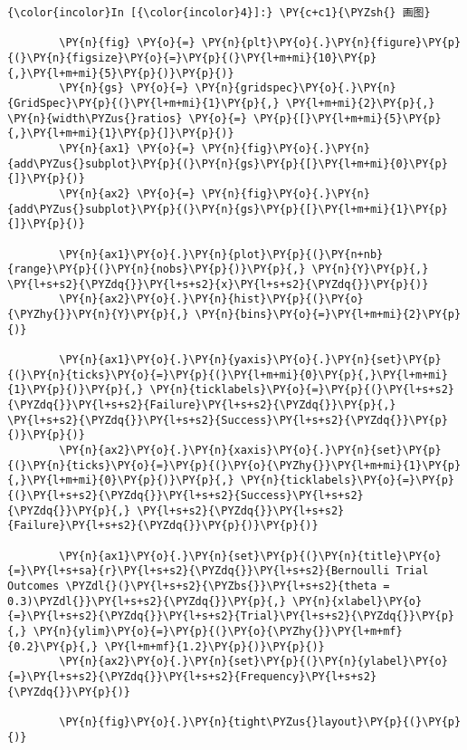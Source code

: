     \begin{Verbatim}[commandchars=\\\{\}]
{\color{incolor}In [{\color{incolor}4}]:} \PY{c+c1}{\PYZsh{} 画图}

        \PY{n}{fig} \PY{o}{=} \PY{n}{plt}\PY{o}{.}\PY{n}{figure}\PY{p}{(}\PY{n}{figsize}\PY{o}{=}\PY{p}{(}\PY{l+m+mi}{10}\PY{p}{,}\PY{l+m+mi}{5}\PY{p}{)}\PY{p}{)}
        \PY{n}{gs} \PY{o}{=} \PY{n}{gridspec}\PY{o}{.}\PY{n}{GridSpec}\PY{p}{(}\PY{l+m+mi}{1}\PY{p}{,} \PY{l+m+mi}{2}\PY{p}{,} \PY{n}{width\PYZus{}ratios} \PY{o}{=} \PY{p}{[}\PY{l+m+mi}{5}\PY{p}{,}\PY{l+m+mi}{1}\PY{p}{]}\PY{p}{)}
        \PY{n}{ax1} \PY{o}{=} \PY{n}{fig}\PY{o}{.}\PY{n}{add\PYZus{}subplot}\PY{p}{(}\PY{n}{gs}\PY{p}{[}\PY{l+m+mi}{0}\PY{p}{]}\PY{p}{)}
        \PY{n}{ax2} \PY{o}{=} \PY{n}{fig}\PY{o}{.}\PY{n}{add\PYZus{}subplot}\PY{p}{(}\PY{n}{gs}\PY{p}{[}\PY{l+m+mi}{1}\PY{p}{]}\PY{p}{)}

        \PY{n}{ax1}\PY{o}{.}\PY{n}{plot}\PY{p}{(}\PY{n+nb}{range}\PY{p}{(}\PY{n}{nobs}\PY{p}{)}\PY{p}{,} \PY{n}{Y}\PY{p}{,} \PY{l+s+s2}{\PYZdq{}}\PY{l+s+s2}{x}\PY{l+s+s2}{\PYZdq{}}\PY{p}{)}
        \PY{n}{ax2}\PY{o}{.}\PY{n}{hist}\PY{p}{(}\PY{o}{\PYZhy{}}\PY{n}{Y}\PY{p}{,} \PY{n}{bins}\PY{o}{=}\PY{l+m+mi}{2}\PY{p}{)}

        \PY{n}{ax1}\PY{o}{.}\PY{n}{yaxis}\PY{o}{.}\PY{n}{set}\PY{p}{(}\PY{n}{ticks}\PY{o}{=}\PY{p}{(}\PY{l+m+mi}{0}\PY{p}{,}\PY{l+m+mi}{1}\PY{p}{)}\PY{p}{,} \PY{n}{ticklabels}\PY{o}{=}\PY{p}{(}\PY{l+s+s2}{\PYZdq{}}\PY{l+s+s2}{Failure}\PY{l+s+s2}{\PYZdq{}}\PY{p}{,} \PY{l+s+s2}{\PYZdq{}}\PY{l+s+s2}{Success}\PY{l+s+s2}{\PYZdq{}}\PY{p}{)}\PY{p}{)}
        \PY{n}{ax2}\PY{o}{.}\PY{n}{xaxis}\PY{o}{.}\PY{n}{set}\PY{p}{(}\PY{n}{ticks}\PY{o}{=}\PY{p}{(}\PY{o}{\PYZhy{}}\PY{l+m+mi}{1}\PY{p}{,}\PY{l+m+mi}{0}\PY{p}{)}\PY{p}{,} \PY{n}{ticklabels}\PY{o}{=}\PY{p}{(}\PY{l+s+s2}{\PYZdq{}}\PY{l+s+s2}{Success}\PY{l+s+s2}{\PYZdq{}}\PY{p}{,} \PY{l+s+s2}{\PYZdq{}}\PY{l+s+s2}{Failure}\PY{l+s+s2}{\PYZdq{}}\PY{p}{)}\PY{p}{)}

        \PY{n}{ax1}\PY{o}{.}\PY{n}{set}\PY{p}{(}\PY{n}{title}\PY{o}{=}\PY{l+s+sa}{r}\PY{l+s+s2}{\PYZdq{}}\PY{l+s+s2}{Bernoulli Trial Outcomes \PYZdl{}(}\PY{l+s+s2}{\PYZbs{}}\PY{l+s+s2}{theta = 0.3)\PYZdl{}}\PY{l+s+s2}{\PYZdq{}}\PY{p}{,} \PY{n}{xlabel}\PY{o}{=}\PY{l+s+s2}{\PYZdq{}}\PY{l+s+s2}{Trial}\PY{l+s+s2}{\PYZdq{}}\PY{p}{,} \PY{n}{ylim}\PY{o}{=}\PY{p}{(}\PY{o}{\PYZhy{}}\PY{l+m+mf}{0.2}\PY{p}{,} \PY{l+m+mf}{1.2}\PY{p}{)}\PY{p}{)}
        \PY{n}{ax2}\PY{o}{.}\PY{n}{set}\PY{p}{(}\PY{n}{ylabel}\PY{o}{=}\PY{l+s+s2}{\PYZdq{}}\PY{l+s+s2}{Frequency}\PY{l+s+s2}{\PYZdq{}}\PY{p}{)}

        \PY{n}{fig}\PY{o}{.}\PY{n}{tight\PYZus{}layout}\PY{p}{(}\PY{p}{)}
\end{Verbatim}

